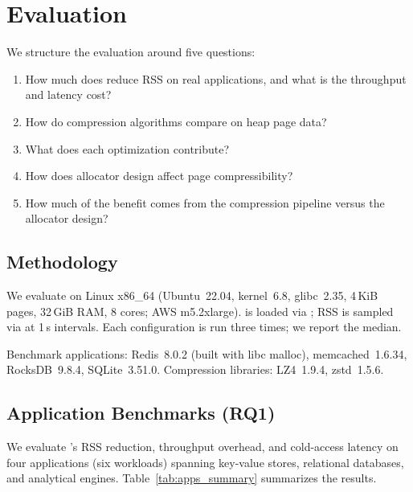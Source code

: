 \section{Evaluation}
\label{sec:eval}

We structure the evaluation around five questions:

\begin{enumerate}
\item[\textbf{RQ1.}] How much does \sys reduce RSS on real
  applications, and what is the throughput and latency cost?
\item[\textbf{RQ2.}] How do compression algorithms compare on heap
  page data?
\item[\textbf{RQ3.}] What does each optimization contribute?
\item[\textbf{RQ4.}] How does allocator design affect page
  compressibility?
\item[\textbf{RQ5.}] How much of the benefit comes from the
  compression pipeline versus the allocator design?
\end{enumerate}

\subsection{Methodology}
\label{sec:eval:method}

We evaluate on Linux x86\_64 (Ubuntu~22.04, kernel~6.8,
glibc~2.35, 4\,KiB pages, 32\,GiB RAM, 8 cores; AWS m5.2xlarge).  \sys is loaded
via ; RSS is sampled via
 at 1\,s intervals.
Each configuration is run three times; we report the median.

Benchmark applications: Redis~8.0.2 (built with libc malloc),
memcached~1.6.34, RocksDB~9.8.4, SQLite~3.51.0.
Compression libraries: LZ4~1.9.4, zstd~1.5.6.

\subsection{Application Benchmarks (RQ1)}
\label{sec:eval:apps}

We evaluate \sys's RSS reduction, throughput overhead, and
cold-access latency on four applications (six workloads) spanning
key-value stores, relational databases, and analytical engines.
Table~\ref{tab:apps_summary} summarizes the results.


